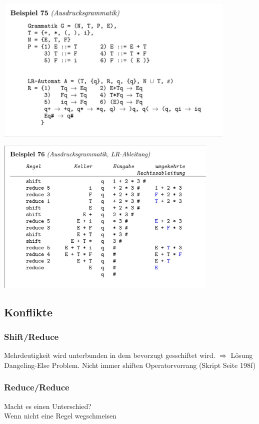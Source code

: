 \begin{center}
  \includegraphics[height=7cm]{image/Screenshot 2022-12-10 170319.jpg}
\end{center}
\begin{center}
  \includegraphics[height=7.5cm]{image/Screenshot 2022-12-10 170336.jpg}
\end{center}
\subsection{Konflikte}
\subsubsection*{Shift/Reduce}
Mehrdeutigkeit wird unterbunden in dem bevorzugt gesschiftet wird. $\Longrightarrow$ Lösung Dangeling-Else Problem.
Nicht immer shiften Operatorvorrang (Skript Seite 198f)
\subsubsection*{Reduce/Reduce}
Macht es einen Unterschied?\\
Wenn nicht eine Regel wegschmeisen 
